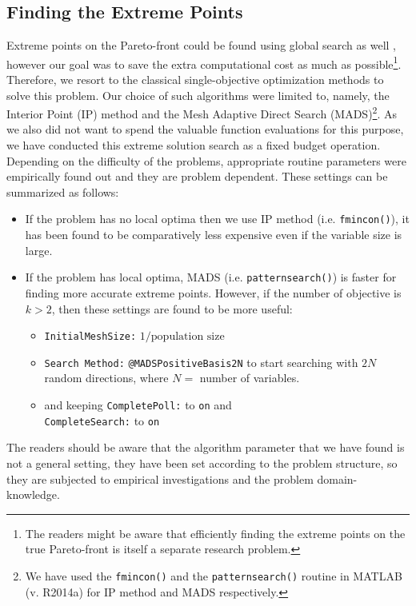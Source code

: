 \documentclass{sig-alternate-05-2015}
\begin{document}
\subsection{Finding the Extreme Points}
\label{sec:find-extreme-points}
Extreme points on the Pareto-front could be found using global search as well \cite{nadir-estimation}, however our goal was to save the extra computational cost as much as possible\footnote{The readers might be aware that efficiently finding the extreme points on the true Pareto-front is itself a separate research problem.}. Therefore, we resort to the classical single-objective optimization methods to solve this problem. Our choice of such algorithms were limited to, namely, the Interior Point (IP) method and the Mesh Adaptive Direct Search (MADS)\footnote{We have used the \texttt{fmincon()} and the \texttt{patternsearch()} routine in MATLAB (v. R2014a) for IP method and MADS respectively.}. As we also did not want to spend the valuable function evaluations for this purpose, we have conducted this extreme solution search as a fixed budget operation. Depending on the difficulty of the problems, appropriate routine parameters were empirically found out and they are problem dependent. These settings can be summarized as follows: 
%
\begin{itemize}
	\item If the problem has no local optima then we use IP method (i.e. \texttt{fmincon()}), it has been found to be comparatively less expensive even if the variable size is large.
	\item If the problem has local optima, MADS (i.e. \texttt{patternsearch()}) is faster for finding more accurate extreme points. However, if the number of objective is $k > 2$, then these settings are found to be more useful:
		\begin{itemize}
			\item \texttt{InitialMeshSize:} \(1/\text{population size}\)
			\item \texttt{Search Method:} \texttt{@MADSPositiveBasis2N} to start searching with $2N$ random directions, where $N =$ number of variables.
			\item and keeping \texttt{CompletePoll:} to \texttt{on} and\\ \texttt{CompleteSearch:} to \texttt{on}
		\end{itemize}
\end{itemize}
%
The readers should be aware that the algorithm parameter that we have found is not a general setting, they have been set according to the problem structure, so they are subjected to empirical investigations and the problem domain-knowledge. 
\end{document}
